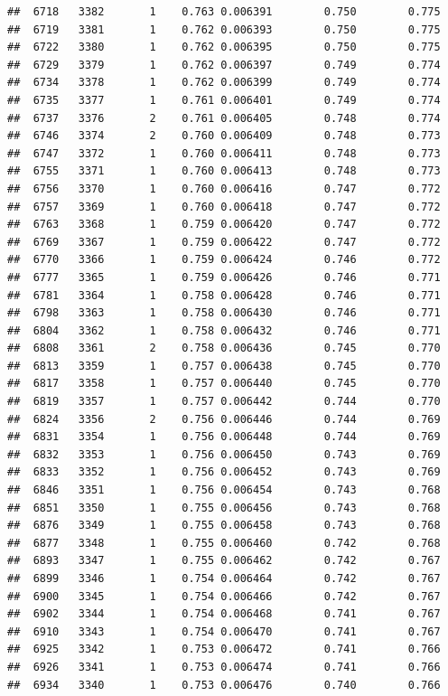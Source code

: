 \documentclass[
]{book}
\begin{document}
\begin{verbatim}
##  6718   3382       1    0.763 0.006391        0.750        0.775
##  6719   3381       1    0.762 0.006393        0.750        0.775
##  6722   3380       1    0.762 0.006395        0.750        0.775
##  6729   3379       1    0.762 0.006397        0.749        0.774
##  6734   3378       1    0.762 0.006399        0.749        0.774
##  6735   3377       1    0.761 0.006401        0.749        0.774
##  6737   3376       2    0.761 0.006405        0.748        0.774
##  6746   3374       2    0.760 0.006409        0.748        0.773
##  6747   3372       1    0.760 0.006411        0.748        0.773
##  6755   3371       1    0.760 0.006413        0.748        0.773
##  6756   3370       1    0.760 0.006416        0.747        0.772
##  6757   3369       1    0.760 0.006418        0.747        0.772
##  6763   3368       1    0.759 0.006420        0.747        0.772
##  6769   3367       1    0.759 0.006422        0.747        0.772
##  6770   3366       1    0.759 0.006424        0.746        0.772
##  6777   3365       1    0.759 0.006426        0.746        0.771
##  6781   3364       1    0.758 0.006428        0.746        0.771
##  6798   3363       1    0.758 0.006430        0.746        0.771
##  6804   3362       1    0.758 0.006432        0.746        0.771
##  6808   3361       2    0.758 0.006436        0.745        0.770
##  6813   3359       1    0.757 0.006438        0.745        0.770
##  6817   3358       1    0.757 0.006440        0.745        0.770
##  6819   3357       1    0.757 0.006442        0.744        0.770
##  6824   3356       2    0.756 0.006446        0.744        0.769
##  6831   3354       1    0.756 0.006448        0.744        0.769
##  6832   3353       1    0.756 0.006450        0.743        0.769
##  6833   3352       1    0.756 0.006452        0.743        0.769
##  6846   3351       1    0.756 0.006454        0.743        0.768
##  6851   3350       1    0.755 0.006456        0.743        0.768
##  6876   3349       1    0.755 0.006458        0.743        0.768
##  6877   3348       1    0.755 0.006460        0.742        0.768
##  6893   3347       1    0.755 0.006462        0.742        0.767
##  6899   3346       1    0.754 0.006464        0.742        0.767
##  6900   3345       1    0.754 0.006466        0.742        0.767
##  6902   3344       1    0.754 0.006468        0.741        0.767
##  6910   3343       1    0.754 0.006470        0.741        0.767
##  6925   3342       1    0.753 0.006472        0.741        0.766
##  6926   3341       1    0.753 0.006474        0.741        0.766
##  6934   3340       1    0.753 0.006476        0.740        0.766

\end{verbatim}
\end{document}
